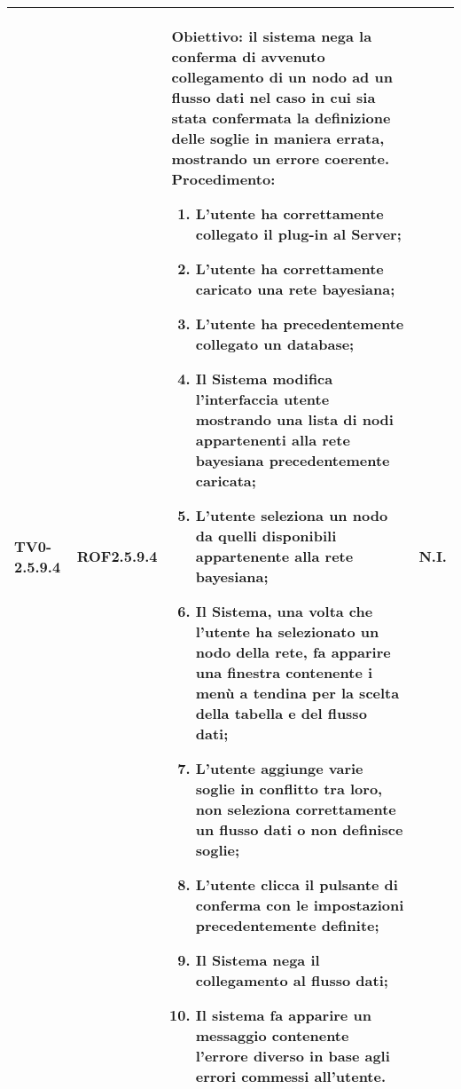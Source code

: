 \begin{longtable}{|C{.15\textwidth}|C{.13\textwidth}|m{.65\textwidth}|C{.08\textwidth}|}
TV0-2.5.9.4 & ROF2.5.9.4  &
	\textbf{Obiettivo}: il sistema nega la conferma di avvenuto collegamento di un nodo ad un flusso dati nel caso in cui sia stata confermata la definizione delle soglie in maniera errata, mostrando un errore coerente. \newline
	\textbf{Procedimento}:
	\begin{enumerate}
		\item L'utente ha correttamente collegato il plug-in al Server;
		\item L'utente ha correttamente caricato una rete bayesiana;
		\item L'utente ha precedentemente collegato un database;
		\item Il Sistema modifica l'interfaccia utente mostrando una lista di nodi appartenenti alla rete bayesiana precedentemente caricata;
		\item L'utente seleziona un nodo da quelli disponibili appartenente alla rete bayesiana;
		\item Il Sistema, una volta che l'utente ha selezionato un nodo della rete, fa apparire una finestra contenente i menù a tendina per la scelta della tabella e del flusso dati;
		\item L'utente aggiunge varie soglie in conflitto tra loro, non seleziona correttamente un flusso dati o non definisce soglie;
		\item L'utente clicca il pulsante di conferma con le impostazioni precedentemente definite;
		\item Il Sistema nega il collegamento al flusso dati;
		\item Il sistema fa apparire un messaggio contenente l'errore diverso in base agli errori commessi all'utente.
	\end{enumerate}
	& N.I. \\
\hline


\end{longtable}
